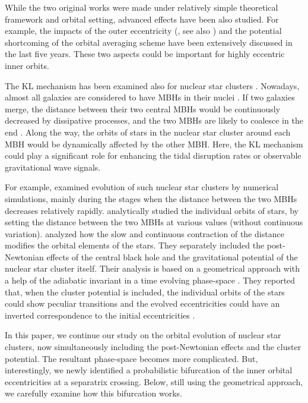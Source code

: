 \documentclass[useAMS,usenatbib,twocolumn]{mn2e}
\begin{document}
 While the two original works \citep{kozai1962,lidov1962}  were made under relatively simple theoretical framework and  orbital setting, advanced effects have been also studied. For example,  the impacts of the outer eccentricity  (\citealt{naoz2016}, see also \citealt{shapee2013,michaely2014}) and the potential shortcoming of the orbital averaging scheme \citep{bode2014,luo2016} have been extensively discussed in the last five years. These two aspects could be important for highly eccentric inner orbits. 



The KL mechanism has been examined also for nuclear star clusters \citep{ivanov2005,wegg2011,chen2011,bode2014,li2014,iwasa2016,stephan2016}.
Nowadays, almost all galaxies are considered to have MBHs in their nuclei \citep{ferrarese2005}. If two galaxies merge, the distance between their two central  MBHs would be continuously decreased by dissipative processes, and the two MBHs are likely to coalesce in the end \citep{merritt2013}.  
Along the way, the orbits of stars in the nuclear star cluster around each MBH would be dynamically affected by the other MBH. Here, the KL mechanism could play a significant role  for enhancing  the tidal disruption rates
 or observable gravitational wave signals. 

For example, \cite{bode2014} examined evolution of such nuclear star clusters by numerical simulations, mainly during the stages when the distance between the two MBHs decreases relatively rapidly.  \cite{li2014} analytically studied the individual orbits of stars, by setting the distance between the two MBHs at various values (without continuous variation). \cite{iwasa2016} analyzed how the slow and continuous contraction of the distance modifies the orbital elements of the stars. They separately included the post-Newtonian effects of the central black hole and the gravitational potential of the nuclear star cluster itself.  Their analysis is based on a geometrical approach with a help of the adiabatic invariant in a time evolving phase-space \citep{landau1969,ssd}. They reported that, when the cluster potential is included, the individual orbits of the stars could show peculiar transitions and the evolved  eccentricities could have an inverted  correspondence to the initial eccentricities \citep[see Fig. 3 in][]{iwasa2016}.


In this paper, we continue our study on the orbital evolution of  nuclear star clusters, now simultaneously including the post-Newtonian effects and the cluster potential.  The resultant phase-space becomes  more complicated.  But, interestingly, we newly identified a probabilistic bifurcation of the inner orbital eccentricities at a separatrix crossing.  Below, still using the geometrical approach, we carefully examine how this bifurcation works. 
\end{document}
